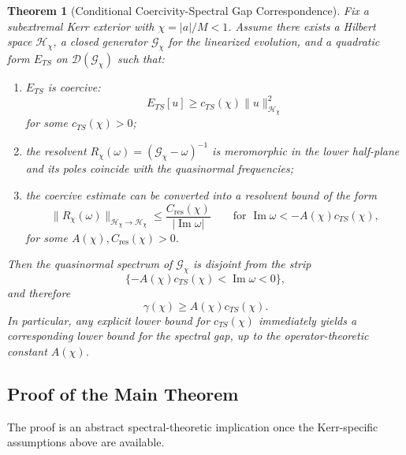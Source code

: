 \documentclass[12pt,a4paper]{article}
\newtheorem{theorem}{Theorem}[section]
\begin{document}
\begin{theorem}[Conditional Coercivity-Spectral Gap Correspondence]\label{thm:coercivity-spectral-main}\label{thm:coercivity-spectral-gap}
Fix a subextremal Kerr exterior with $\chi = |a|/M < 1$. Assume there exists a Hilbert space $\mathcal{H}_\chi$, a closed generator $\mathcal{G}_\chi$ for the linearized evolution, and a quadratic form $E_{TS}$ on $\mathcal{D}(\mathcal{G}_\chi)$ such that:
\begin{enumerate}
    \item $E_{TS}$ is coercive:
    \begin{equation}
    E_{TS}[u] \ge c_{TS}(\chi)\|u\|_{\mathcal{H}_\chi}^2
    \end{equation}
    for some $c_{TS}(\chi)>0$;
    \item the resolvent $R_\chi(\omega)=(\mathcal{G}_\chi-\omega)^{-1}$ is meromorphic in the lower half-plane and its poles coincide with the quasinormal frequencies;
    \item the coercive estimate can be converted into a resolvent bound of the form
    \begin{equation}
    \|R_\chi(\omega)\|_{\mathcal{H}_\chi\to\mathcal{H}_\chi}
    \le \frac{C_{\mathrm{res}}(\chi)}{|\operatorname{Im}\omega|}
    \qquad \text{for } \operatorname{Im}\omega < -A(\chi)c_{TS}(\chi),
    \end{equation}
    for some $A(\chi),C_{\mathrm{res}}(\chi)>0$.
\end{enumerate}
Then the quasinormal spectrum of $\mathcal{G}_\chi$ is disjoint from the strip
\begin{equation}
\{-A(\chi)c_{TS}(\chi) < \operatorname{Im}\omega < 0\},
\end{equation}
and therefore
\begin{equation}
\gamma(\chi) \ge A(\chi)c_{TS}(\chi).
\end{equation}
In particular, any explicit lower bound for $c_{TS}(\chi)$ immediately yields a corresponding lower bound for the spectral gap, up to the operator-theoretic constant $A(\chi)$.
\end{theorem}

\subsection{Proof of the Main Theorem}

The proof is an abstract spectral-theoretic implication once the Kerr-specific assumptions above are available.
\end{document}

